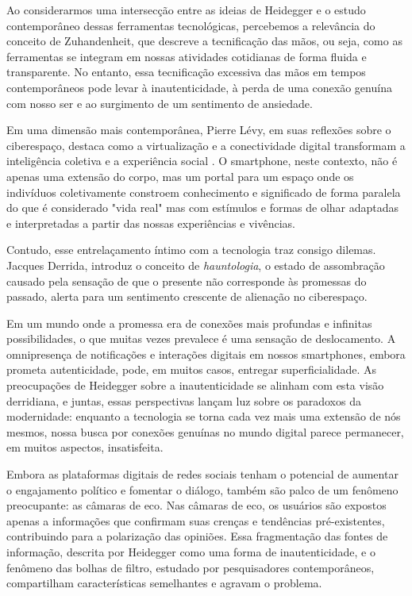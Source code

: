 Ao considerarmos uma intersecção entre as ideias de Heidegger e o estudo contemporâneo dessas ferramentas tecnológicas, percebemos a relevância do conceito de Zuhandenheit, que descreve a tecnificação das mãos, ou seja, como as ferramentas se integram em nossas atividades cotidianas de forma fluida e transparente. No entanto, essa tecnificação excessiva das mãos em tempos contemporâneos pode levar à inautenticidade, à perda de uma conexão genuína com nosso ser e ao surgimento de um sentimento de ansiedade.

Em uma dimensão mais contemporânea, Pierre Lévy, em suas reflexões sobre o ciberespaço, destaca como a virtualização e a conectividade digital transformam a inteligência coletiva e a experiência social \cite{2010_Levy_BOOK}. O smartphone, neste contexto, não é apenas uma extensão do corpo, mas um portal para um espaço onde os indivíduos coletivamente constroem conhecimento e significado de forma paralela do que é considerado "vida real" mas com estímulos e formas de olhar adaptadas e interpretadas a partir das nossas experiências e vivências.

Contudo, esse entrelaçamento íntimo com a tecnologia traz consigo dilemas. Jacques Derrida, introduz o conceito de \textit{hauntologia}, o estado de assombração causado pela sensação de que o presente não corresponde às promessas do passado, alerta para um sentimento crescente de alienação no ciberespaço. 

Em um mundo onde a promessa era de conexões mais profundas e infinitas possibilidades, o que muitas vezes prevalece é uma sensação de deslocamento. A omnipresença de notificações e interações digitais em nossos smartphones, embora prometa autenticidade, pode, em muitos casos, entregar superficialidade. As preocupações de Heidegger sobre a inautenticidade se alinham com esta visão derridiana, e juntas, essas perspectivas lançam luz sobre os paradoxos da modernidade: enquanto a tecnologia se torna cada vez mais uma extensão de nós mesmos, nossa busca por conexões genuínas no mundo digital parece permanecer, em muitos aspectos, insatisfeita.

Embora as plataformas digitais de redes sociais tenham o potencial de aumentar o engajamento político e fomentar o diálogo, também são palco de um fenômeno preocupante: as câmaras de eco. Nas câmaras de eco, os usuários são expostos apenas a informações que confirmam suas crenças e tendências pré-existentes, contribuindo para a polarização das opiniões. Essa fragmentação das fontes de informação, descrita por Heidegger como uma forma de inautenticidade, e o fenômeno das bolhas de filtro, estudado por pesquisadores contemporâneos, compartilham características semelhantes e agravam o problema.

